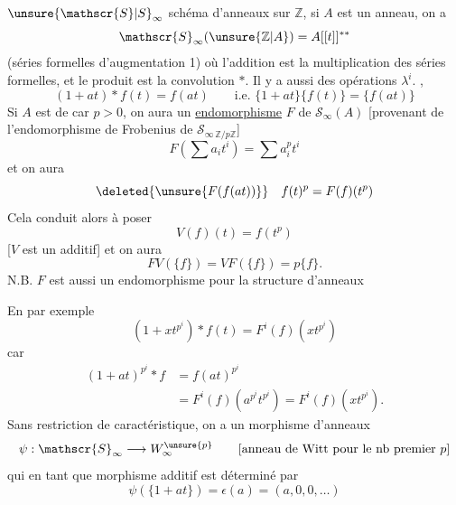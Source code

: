 ${\unsure{\mathscr{S}|S}}_\infty$ schéma d'anneaux  sur $\mathbb{Z}$, si $A$ est un anneau, on a
\[
\mathscr{S}_\infty({\unsure{\mathbb{Z}|A}})=A[[t]]^{**}
\]
(séries formelles d'augmentation 1) où l'addition est la multiplication des séries formelles, et le produit est la convolution $*$. Il y a aussi des opérations $\lambda^i$. {},
\[
(1+at)*f(t)=f(at)\qquad\text{i.e. }\{1+at\}\{f(t)\}=\{f(at)\}
\]
Si $A$ est de car $p>0$, on aura un \uline{endomorphisme} $F$ de $\mathscr{S}_\infty(A)$ [provenant de l'endomorphisme de Frobenius de $\mathscr{S}_{\infty\,\mathbb{Z}/p\mathbb{Z}}$]
\[
F\left(\sum a_it^i\right)=\sum a_i^pt^i
\]
et on aura
\[
\deleted{{\unsure{F(f(at))}}}\quad f(t)^p=F(f)(t^p)
\]
Cela conduit alors à poser
\[
V(f)(t)=f(t^p)
\]
[$V$ est un {} additif] et on aura
\[
FV(\{f\})=VF(\{f\})=p\{f\}.
\]
N.B. $F$ est aussi un endomorphisme pour la structure d'anneaux

En  par exemple
\[
(1+xt^{p^i})*f(t)=F^i(f)(xt^{p^i})
\]
car 
\[
\begin{aligned}
(1+at)^{p^i}*f&=f(at)^{p^i}\\
&=F^i(f)(a^{p^i}t^{p^i})=F^i(f)(xt^{p^i}).
\end{aligned}
\]
Sans restriction  de caractéristique, on a un morphisme d'anneaux
\[
\psi:\mathscr{S}_\infty\longrightarrow W_\infty^{{\unsure{p}}}\qquad[\text{anneau de Witt pour le nb premier }p]
\]
qui en tant que morphisme additif est déterminé par
\[
\psi(\{1+at\})=\epsilon(a)=(a,0,0,\ldots)
\]
